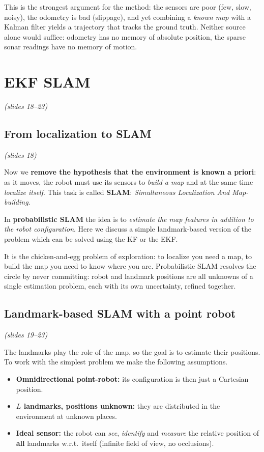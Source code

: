 \documentclass[11pt,a4paper]{article}
\theoremstyle{definition}
\theoremstyle{plain}
\theoremstyle{remark}
\newcommand{\slides}[1]{\par\vspace{-2pt}\noindent\emph{(slides #1)}\par\smallskip}
\begin{document}
\begin{intuition}
This is the strongest argument for the method: the sensors are poor (few, slow, noisy), the odometry is bad (slippage), and yet combining a \emph{known map} with a Kalman filter yields a trajectory that tracks the ground truth. Neither source alone would suffice: odometry has no memory of absolute position, the sparse sonar readings have no memory of motion.
\end{intuition}

\section{EKF SLAM}
\slides{18--23}

\subsection{From localization to SLAM}
\slides{18}

Now we \textbf{remove the hypothesis that the environment is known a priori}: as it moves, the robot must use its sensors to \emph{build a map} and at the same time \emph{localize itself}. This task is called \textbf{SLAM}: \emph{Simultaneous Localization And Map-building}.

In \textbf{probabilistic SLAM} the idea is to \emph{estimate the map features in addition to the robot configuration}. Here we discuss a simple landmark-based version of the problem which can be solved using the KF or the EKF.

\begin{intuition}
It is the chicken-and-egg problem of exploration: to localize you need a map, to build the map you need to know where you are. Probabilistic SLAM resolves the circle by never committing: robot and landmark positions are all unknowns of a single estimation problem, each with its own uncertainty, refined together.
\end{intuition}

\subsection{Landmark-based SLAM with a point robot}
\slides{19--23}

The landmarks play the role of the map, so the goal is to estimate their positions. To work with the simplest problem we make the following assumptions.
\begin{itemize}
  \item \textbf{Omnidirectional point-robot:} its configuration is then just a Cartesian position.
  \item \textbf{$L$ landmarks, positions unknown:} they are distributed in the environment at unknown places.
  \item \textbf{Ideal sensor:} the robot can \emph{see}, \emph{identify} and \emph{measure} the relative position of \textbf{all} landmarks w.r.t.\ itself (infinite field of view, no occlusions).
\end{itemize}
\end{document}
